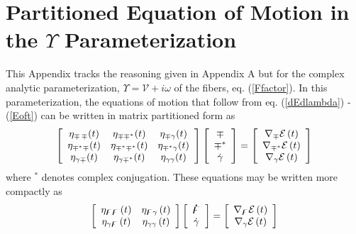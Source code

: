 \documentclass[aps,preprint]{revtex4}%
\begin{document}
\section{Partitioned Equation of Motion in the $\Upsilon$ Parameterization}

This Appendix tracks the reasoning given in Appendix A but for the complex
analytic parameterization, $\Upsilon=\mathcal{V}+i\omega$ of the fibers, eq.
(\ref{Ffactor}). In this parameterization, the equations of motion that follow
from eq. (\ref{dEdlambda}) - (\ref{Eoft}) can be written in matrix partitioned
form as
\begin{equation}
\left[
\begin{array}
[c]{ccc}%
\eta_{\mathcal{\Upsilon}\,\mathcal{\Upsilon}}(t) & \eta_{\mathcal{\Upsilon
\Upsilon}^{\ast}}(t) & \eta_{\mathcal{\Upsilon}\gamma}(t)\\
\eta_{\mathcal{\Upsilon}^{\ast}\mathcal{\Upsilon}}(t) & \eta
_{\mathcal{\Upsilon}^{\ast}\mathcal{\Upsilon}^{\ast}}(t) & \eta
_{\mathcal{\Upsilon}^{\ast}\gamma}(t)\\
\eta_{\gamma\mathcal{\Upsilon}}(t) & \eta_{\gamma\mathcal{\Upsilon}^{\ast}%
}(t) & \eta_{\gamma\gamma}(t)
\end{array}
\right]  \left[
\begin{array}
[c]{c}%
\mathcal{\Upsilon}\\
\mathcal{\Upsilon}^{\ast}\\
\dot{\gamma}%
\end{array}
\right]  =\left[
\begin{array}
[c]{c}%
\nabla_{\mathcal{\Upsilon}}\mathcal{E}\left(  t\right) \\
\nabla_{\mathcal{\Upsilon}^{\ast}}\mathcal{E}\left(  t\right) \\
\nabla_{\gamma}\mathcal{E}\left(  t\right)
\end{array}
\right]  \label{3x3partmat}%
\end{equation}
where $^{\ast}$ denotes complex conjugation. These equations may be written
more compactly as
\begin{equation}
\left[
\begin{array}
[c]{cc}%
\eta_{\mathbf{\digamma\digamma}}\left(  t\right)  & \eta_{\mathbf{\digamma
}\gamma}\left(  t\right) \\
\eta_{\gamma\mathbf{\digamma}}\left(  t\right)  & \eta_{\gamma\gamma}\left(
t\right)
\end{array}
\right]  \left[
\begin{array}
[c]{c}%
\mathbf{\dot{\digamma}}\\
\dot{\gamma}%
\end{array}
\right]  =\left[
\begin{array}
[c]{c}%
\nabla_{\mathbf{\digamma}}\mathcal{E}\left(  t\right) \\
\nabla_{\gamma}\mathcal{E}\left(  t\right)
\end{array}
\right]  \label{partmat2}%
\end{equation}
\end{document}
